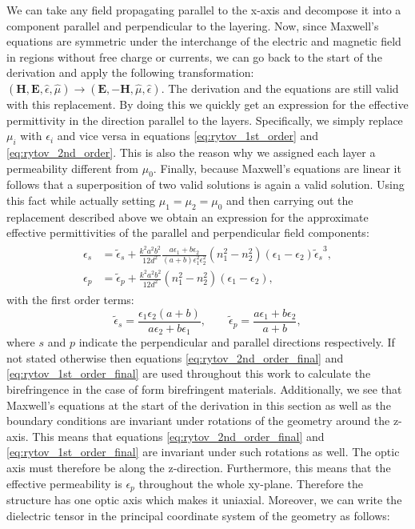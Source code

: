 We can take any field propagating parallel to the x-axis and decompose it into a component parallel and perpendicular to the layering. Now, since Maxwell's equations are symmetric under the interchange of the electric and magnetic field in regions without free charge or currents, we can go back to the start of the derivation and apply the following transformation: $(\bm{H},\bm{E},\hat{\epsilon},\hat{\mu}) \rightarrow (\bm{E},\bm{-H},\hat{\mu},\hat{\epsilon})$. The derivation and the equations are still valid with this replacement. By doing this we quickly get an expression for the effective permittivity in the direction parallel to the layers. Specifically, we simply replace $\mu_i$ with $\epsilon_i$ and vice versa in equations \ref{eq:rytov_1st_order} and \ref{eq:rytov_2nd_order}. This is also the reason why we assigned each layer a permeability different from $\mu_0$. Finally, because Maxwell's equations are linear it follows that a superposition of two valid solutions is again a valid solution. Using this fact while actually setting $\mu_1=\mu_2=\mu_0$ and then carrying out the replacement described above we obtain an expression for the approximate effective permittivities of the parallel and perpendicular field components:
\begin{align}
\begin{split}
    \label{eq:rytov_2nd_order_final}
    \epsilon_{s} &= \tilde{\epsilon}_{s} + \frac{k^2a^2b^2}{12d^2} \frac{a\epsilon_1+b\epsilon_2}{(a+b)\epsilon_1^2\epsilon_2^2}\left(n_1^2-n_2^2\right)\left(\epsilon_1-\epsilon_2\right){\tilde{\epsilon}_{s}}^3,
    \\
    \epsilon_{p} &= \tilde{\epsilon}_{p} + \frac{k^2a^2b^2}{12d^2}\left(n_1^2-n_2^2\right)\left(\epsilon_1-\epsilon_2\right),
\end{split}
\end{align}
with the first order terms:
\begin{equation}
    \label{eq:rytov_1st_order_final}
    \tilde{\epsilon}_{s} = \frac{\epsilon_1 \epsilon_2 (a+b)}{a\epsilon_2+b\epsilon_1},
    \qquad
    \tilde{\epsilon}_{p} = \frac{a\epsilon_1+b\epsilon_2}{a+b},
\end{equation}
where $s$ and $p$ indicate the perpendicular and parallel directions respectively. If not stated otherwise then equations \ref{eq:rytov_2nd_order_final} and \ref{eq:rytov_1st_order_final} are used throughout this work to calculate the birefringence in the case of form birefringent materials. Additionally, we see that Maxwell's equations at the start of the derivation in this section as well as the boundary conditions are invariant under rotations of the geometry around the z-axis. This means that equations \ref{eq:rytov_2nd_order_final} and \ref{eq:rytov_1st_order_final} are invariant under such rotations as well. The optic axis must therefore be along the z-direction. Furthermore, this means that the effective permeability is $\epsilon_{p}$ throughout the whole xy-plane. Therefore the structure has one optic axis which makes it uniaxial. Moreover, we can write the dielectric tensor in the principal coordinate system of the geometry as follows:
